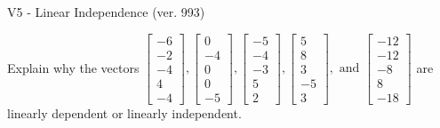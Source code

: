 \begin{exercise}
  \begin{exerciseTitle}V5 - Linear Independence (ver. 993)\end{exerciseTitle}
  \begin{exerciseStatement}
    Explain why the vectors \(\left[\begin{array}{r}
-6 \\
-2 \\
-4 \\
4 \\
-4
\end{array}\right] , \left[\begin{array}{r}
0 \\
-4 \\
0 \\
0 \\
-5
\end{array}\right] , \left[\begin{array}{r}
-5 \\
-4 \\
-3 \\
5 \\
2
\end{array}\right] , \left[\begin{array}{r}
5 \\
8 \\
3 \\
-5 \\
3
\end{array}\right] , \text{ and } \left[\begin{array}{r}
-12 \\
-12 \\
-8 \\
8 \\
-18
\end{array}\right]\) are linearly dependent or linearly independent.	



\end{exerciseStatement}
\end{exercise}
